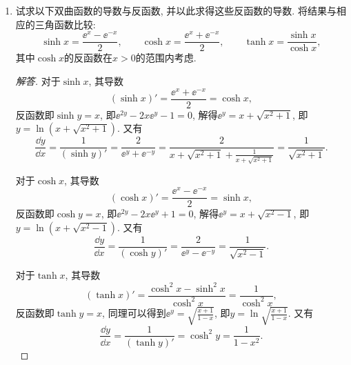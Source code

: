 \begin{2a}
\begin{enumerate}
进一步, 试求最小的\(\alpha\), 使得对于任何\(x\in\left(0,\frac{\pi}{2}\right)\), 成立\(x<\frac{\sin x}{\cos^\alpha x}\).
\begin{proof}
设\(F(x)=x-\frac{\sin x}{\cos^{\alpha}x}\), 那么
\[F'(x)=1-\frac{\cos^{\alpha+1}x+\alpha\cos^{\alpha-1}x\sin^2x}{\cos^{2\alpha}x}
=\frac{\cos^{\alpha+1}x-(1-\alpha)\cos^2x-\alpha}{\cos^{\alpha+1}x},\]
考虑\[f(t)=\cos^{\alpha+1}x-(1-\alpha)\cos^2x-\alpha=(1-t)^{\alpha+1}-(1-\alpha)(1-t)^2-\alpha,\]
其中\(t=1-\cos x\), 注意到\(F(0)=0\), 由于\(F(x)\)在\(\left(0,\frac{\pi}{2}\right)\)上连续, 并且\(f(0)=0\), 考虑
\[f'(t)=2(1-\alpha)(1-t)-(\alpha+1)(1-t)^\alpha,\]
\(f'(0)=1-3\alpha\), 若\(f'(0)>0\), 则存在\(\delta>0\)使得\(F(x)\)在\((0,\delta)\)上单调递增, 不符题设, 从而\(\alpha\geqslant\frac{1}{3}\).
\end{proof}
\item 试求以下双曲函数的导数与反函数, 并以此求得这些反函数的导数. 将结果与相应的三角函数比较:
\[\sinh x=\frac{\ee^x-\ee^{-x}}{2},\qquad \cosh x=\frac{\ee^x+\ee^{-x}}{2},\qquad \tanh x=\frac{\sinh x}{\cosh x},\]其中\(\cosh x\)的反函数在\(x>0\)的范围内考虑.
\begin{proof}[解答]
对于\(\sinh x\), 其导数\[\left(\sinh x\right)'=\frac{\ee^x+\ee^{-x}}{2}=\cosh x,\]
反函数即\(\sinh y=x\), 即\(\ee^{2y}-2x\ee^{y}-1=0\), 
解得\(\ee^{y}=x+\sqrt{x^2+1}\), 即\(y=\ln(x+\sqrt{x^2+1})\). 又有
\[\frac{\dd y}{\dd x}=\frac{1}{(\sinh y)'}=\frac{2}{\ee^{y}+\ee^{-y}}
=\frac{2}{x+\sqrt{x^2+1}+\displaystyle\frac{1}{x+\sqrt{x^2+1}}}
=\frac{1}{\sqrt{x^2+1}}.\]

对于\(\cosh x\), 其导数\[(\cosh x)'=\frac{\ee^x-\ee^{-x}}{2}=\sinh x,\]
反函数即\(\cosh y=x\), 即\(\ee^{2y}-2x\ee^{y}+1=0\), 
解得\(\ee^y=x+\sqrt{x^2-1}\), 即\(y=\ln(x+\sqrt{x^2-1})\). 又有
\[\frac{\dd y}{\dd x}=\frac{1}{(\cosh y)'}
=\frac{2}{\ee^y-\ee^{-y}}=\frac{1}{\sqrt{x^2-1}}.\]

对于\(\tanh x\), 其导数\[\left(\tanh x\right)'
=\frac{\cosh^2x-\sinh^2x}{\cosh^2x}=\frac{1}{\cosh^2x},\]
反函数即\(\tanh y=x\), 同理可以得到\(\ee^y=\sqrt{\frac{x+1}{1-x}}\), 
即\(y=\ln\sqrt{\frac{x+1}{1-x}}\). 又有
\[\frac{\dd y}{\dd x}=\frac{1}{(\tanh y)'}=\cosh^2y=\frac{1}{1-x^2}.\]


\end{proof}
\end{enumerate}
\end{2a}
